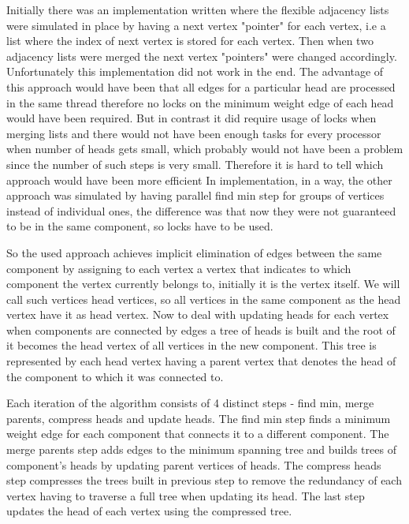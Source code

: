 \documentclass{report}
\theoremstyle{plain}
\theoremstyle{definition}
\theoremstyle{remark}
\begin{document}
Initially there was an implementation written where the flexible adjacency lists were simulated in place by having a next vertex "pointer" for each vertex, i.e a list where the index of next vertex is stored for each vertex. Then when two adjacency lists were merged the next vertex "pointers" were changed accordingly. Unfortunately this implementation did not work in the end. The advantage of this approach would have been that all edges for a particular head are processed in the same thread therefore no locks on the minimum weight edge of each head would have been required. But in contrast it did require usage of locks when merging lists and there would not have been enough tasks for every processor when number of heads gets small, which probably would not have been a problem since the number of such steps is very small. Therefore it is hard to tell which approach would have been more efficient In implementation, in a way, the other approach was simulated by having parallel find min step for groups of vertices instead of individual ones, the difference was that now they were not guaranteed to be in the same component, so locks have to be used.

So the used approach achieves implicit elimination of edges between the same component by assigning to each vertex a vertex that indicates to which component the vertex currently belongs to, initially it is the vertex itself. We will call such vertices head vertices, so all vertices in the same component as the head vertex have it as head vertex. Now to deal with updating heads for each vertex when components are connected by edges a tree of heads is built and the root of it becomes the head vertex of all vertices in the new component. This tree is represented by each head vertex having a parent vertex that denotes the head of the component to which it was connected to.

Each iteration of the algorithm consists of 4 distinct steps - find min, merge parents, compress heads and update heads. The find min step finds a minimum weight edge for each component that connects it to a different component. The merge parents step adds edges to the minimum spanning tree and builds trees of component's heads by updating parent vertices of heads. The compress heads step compresses the trees built in previous step to remove the redundancy of each vertex having to traverse a full tree when updating its head. The last step updates the head of each vertex using the compressed tree.
\end{document}
